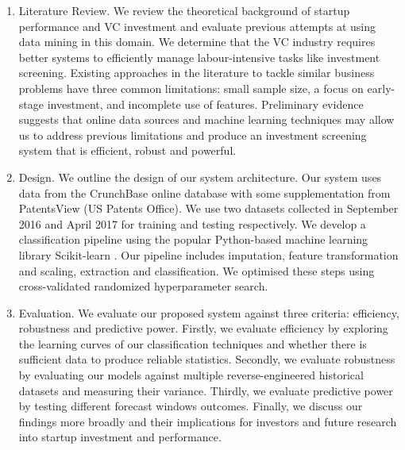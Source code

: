 \documentclass[../thesis/thesis.tex]{subfiles}
\begin{document}
\begin{enumerate}

\item Literature Review. We review the theoretical background of startup performance and VC investment and evaluate previous attempts at using data mining in this domain. We determine that the VC industry requires better systems to efficiently manage labour-intensive tasks like investment screening. Existing approaches in the literature to tackle similar business problems have three common limitations: small sample size, a focus on early-stage investment, and incomplete use of features. Preliminary evidence suggests that online data sources and machine learning techniques may allow us to address previous limitations and produce an investment screening system that is efficient, robust and powerful.

\item Design. We outline the design of our system architecture. Our system uses data from the CrunchBase online database with some supplementation from PatentsView (US Patents Office). We use two datasets collected in September 2016 and April 2017 for training and testing respectively. We develop a classification pipeline using the popular Python-based machine learning library Scikit-learn \cite{pedregosa2011}. Our pipeline includes imputation,  feature transformation and scaling, extraction and classification. We optimised these steps using cross-validated randomized hyperparameter search.

\item Evaluation. We evaluate our proposed system against three criteria: efficiency, robustness and predictive power. Firstly, we evaluate efficiency by exploring the learning curves of our classification techniques and whether there is sufficient data to produce reliable statistics. Secondly, we evaluate robustness by evaluating our models against multiple reverse-engineered historical datasets and measuring their variance. Thirdly, we evaluate predictive power by testing different forecast windows outcomes. Finally, we discuss our findings more broadly and their implications for investors and future research into startup investment and performance.

\end{enumerate}

\end{document}
